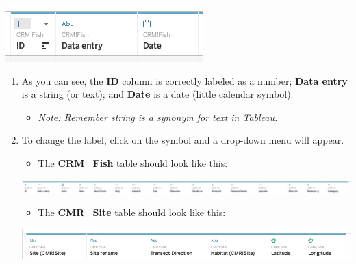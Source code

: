 \documentclass[
]{book}
\providecommand{\tightlist}{%
  \setlength{\itemsep}{0pt}\setlength{\parskip}{0pt}}
\begin{document}
\includegraphics{images/m3s1_image2_Data-Type-Symbols.png}

\begin{enumerate}
\def\labelenumi{\arabic{enumi}.}
\setcounter{enumi}{3}
\item
  As you can see, the \textbf{ID} column is correctly labeled as a number; \textbf{Data entry} is a string (or text); and \textbf{Date} is a date (little calendar symbol).

  \begin{itemize}
  \tightlist
  \item
    \emph{Note: Remember string is a synonym for text in Tableau.}
  \end{itemize}
\item
  To change the label, click on the symbol and a drop-down menu will appear.

  \begin{itemize}
  \tightlist
  \item
    The \textbf{CRM\_Fish} table should look like this:
  \end{itemize}

  \includegraphics{images/m3s1_image3_CRM_Fish-Data-Types.png}

  \begin{itemize}
  \tightlist
  \item
    The \textbf{CMR\_Site} table should look like this:
  \end{itemize}

  \includegraphics{images/m3s1_image4_CMR_Site-Data-Types.png}


\end{enumerate}
\end{document}

